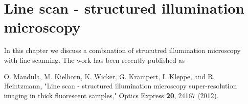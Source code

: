 \chapter{Line scan - structured illumination microscopy\label{ch:LSSIM}}

In this chapter we discuss a combination of strucutred illumination microscopy with line scanning. The work has been recently published as \cite{Mandula2012b}

O. Mandula, M. Kielhorn, K. Wicker, G. Krampert, I. Kleppe, and R. Heintzmann, "Line scan - structured illumination microscopy super-resolution imaging in thick fluorescent samples," Optics Express {\bf20}, 24167 (2012).


%
%
%
%
%
%
%
%
